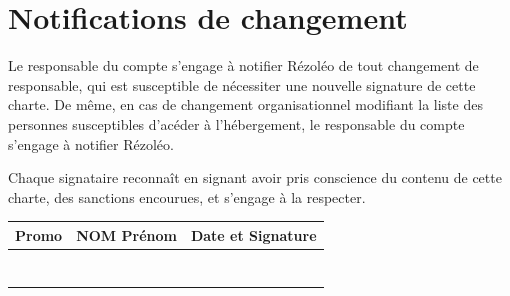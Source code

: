 \documentclass[11pt, a4paper]{article}
\begin{document}
\section{Notifications de changement}
Le responsable du compte s'engage à notifier Rézoléo de tout changement de responsable, qui est susceptible de nécessiter une nouvelle signature de cette charte. De même, en cas de changement organisationnel modifiant la liste des personnes susceptibles d'acéder à l'hébergement, le responsable du compte s'engage à notifier Rézoléo.

\vspace{.5cm}

\noindent Chaque signataire reconnaît en signant avoir pris conscience du contenu de cette charte, des sanctions encourues, et s'engage à la respecter.

\begin{table}[h]
	\centering
	\renewcommand{\arraystretch}{2}
	\small{
		\begin{tabular}{|p{1.5cm}|p{7cm}|p{7cm}|}
			\hline
			\rowcolor{black!10} Promo & NOM Prénom & Date et Signature \\
			\hline
			                          &            &                   \\
			\hline
			                          &            &                   \\
			\hline
			                          &            &                   \\
			\hline
			                          &            &                   \\
			\hline
			                          &            &                   \\
			\hline
			                          &            &                   \\
			\hline
			                          &            &                   \\
			\hline
		\end{tabular}
	}
\end{table}
\end{document}
